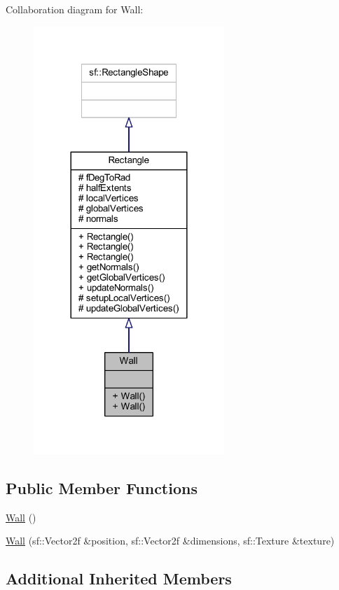 Collaboration diagram for Wall\+:\nopagebreak
\begin{figure}[H]
\begin{center}
\leavevmode
\includegraphics[width=204pt]{class_wall__coll__graph}
\end{center}
\end{figure}
\subsection*{Public Member Functions}
\begin{DoxyCompactItemize}
\item 
\hyperlink{class_wall_a12dc41bc7bc045c55ec1034a43e52043}{Wall} ()
\item 
\hyperlink{class_wall_ac17ed352213a1f0a3918c736e2840e82}{Wall} (sf\+::\+Vector2f \&position, sf\+::\+Vector2f \&dimensions, sf\+::\+Texture \&texture)
\end{DoxyCompactItemize}
\subsection*{Additional Inherited Members}


